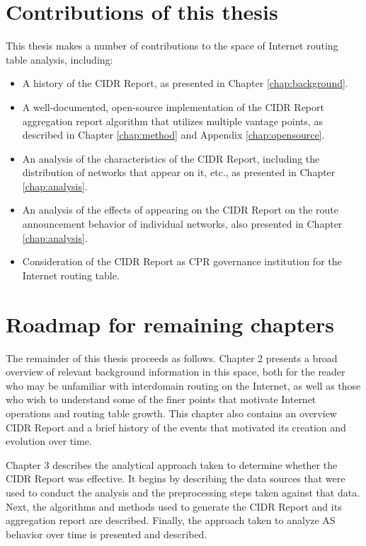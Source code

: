 \section{Contributions of this thesis}

This thesis makes a number of contributions to the space of Internet routing table analysis, including:
\begin{itemize}
\item{A history of the CIDR Report, as presented in Chapter \ref{chap:background}.}
\item{A well-documented, open-source implementation of the CIDR Report aggregation report algorithm that utilizes multiple vantage points, as described in Chapter \ref{chap:method} and Appendix \ref{chap:opensource}.}
\item{An analysis of the characteristics of the CIDR Report, including the distribution of networks that appear on it, etc., as presented in Chapter \ref{chap:analysis}.}
\item{An analysis of the effects of appearing on the CIDR Report on the route announcement behavior of individual networks, also presented in Chapter \ref{chap:analysis}.}
\item{Consideration of the CIDR Report as CPR governance institution for the Internet routing table.}
\end{itemize}

\section{Roadmap for remaining chapters}

The remainder of this thesis proceeds as follows. Chapter 2 presents a broad overview of relevant background information in this space, both for the reader who may be unfamiliar with interdomain routing on the Internet, as well as those who wish to understand some of the finer points that motivate Internet operations and routing table growth. This chapter also contains an overview CIDR Report and a brief history of the events that motivated its creation and evolution over time. 

Chapter 3 describes the analytical approach taken to determine whether the CIDR Report was effective. It begins by describing the data sources that were used to conduct the analysis and the preprocessing steps taken against that data. Next, the algorithms and methods used to generate the CIDR Report and its aggregation report are described. Finally, the approach taken to analyze AS behavior over time is presented and described. 

